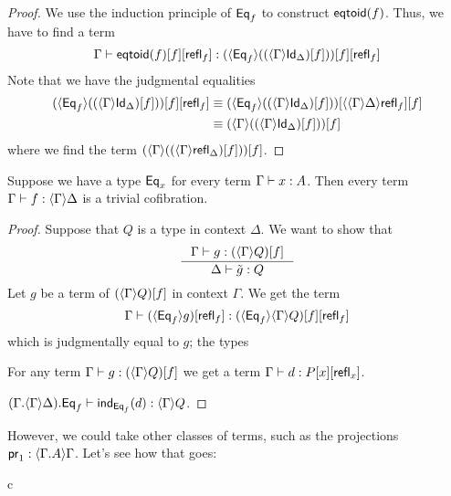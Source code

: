 \begin{proof}
We use the induction principle of $\mathsf{Eq}_{f}$ to construct $\mathsf{eqtoid}(f)$. Thus, we
have to find a term
\begin{equation*}
\jtermt
  {\Gamma}
  {\subst{\refl{f}}{{f}{\ctxwk{\eqtype{f}}{\subst{f}{\ctxwk{\Gamma}{\idtypevar{\Delta}}}}}}}
  {\subst{\refl{f}}{{f}{\eqtoid{f}}}}
\end{equation*}
Note that we have the judgmental equalities
\begin{align*}
\subst{\refl{f}}{{f}{\ctxwk{\eqtype{f}}{\subst{f}{\ctxwk{\Gamma}{\idtypevar{\Delta}}}}}}
& \jdeq \subst{f}{{\ctxwk{{\Gamma}{\Delta}}{\refl{f}}}{\ctxwk{\eqtype{f}}{\subst{f}{\ctxwk{\Gamma}{\idtypevar{\Delta}}}}}} \\
& \jdeq \subst{f}{\ctxwk{\Gamma}{\subst{f}{\ctxwk{\Gamma}{\idtypevar{\Delta}}}}}
\end{align*}
where we find the term $\subst{f}{\ctxwk{\Gamma}{\subst{f}{\ctxwk{\Gamma}{\refl{\Delta}}}}}$.
\end{proof}

\begin{conj}
Suppose we have a type $\mathsf{Eq}_{x}$ for every term $\jtermt{\Gamma}{A}{x}$. Then
every term $\jtermt{\Gamma}{\ctxwk{\Gamma}{\Delta}}{f}$ is a trivial cofibration.
\end{conj}

\begin{proof}
Suppose that $Q$ is a type in context $\Delta$. We want to show that
\begin{equation*}
\inference{\jtermt{\Gamma}{\subst{f}{\ctxwk{\Gamma}{Q}}}{g}}{\jtermt{\Delta}{Q}{\tilde{g}}}
\end{equation*}
Let $g$ be a term of $\subst{f}{\ctxwk{\Gamma}{Q}}$ in context $\Gamma$. We get
the term
\begin{equation*}
\jtermt{\Gamma}{\subst{\refl{f}}{{f}{\ctxwk{\eqtype{f}}{{\Gamma}{Q}}}}}{\subst{\refl{f}}{\ctxwk{\eqtype{f}}{g}}}
\end{equation*}
which is judgmentally equal to $g$; the types

For any term $\jtermt{\Gamma}{\subst{f}{\ctxwk{\Gamma}{Q}}}{g}$ we get a term 
$\jtermt{\Gamma}{\subst{\refl{x}}{{x}{P}}}{d}$.

$\jtermt{\ctxext{{\Gamma}{\ctxwk{\Gamma}{\Delta}}}{\eqtype{f}}}{\ctxwk{\Gamma}{Q}}{\ind{\eqtype{f}}(d)}$.
\end{proof}

However, we could take other classes of terms, such as the projections
$\proj1:\ctxwk{\ctxext{\Gamma}{A}}{\Gamma}$. Let's see how that goes:

\begin{infarray}{c}
\\
\end{infarray}
